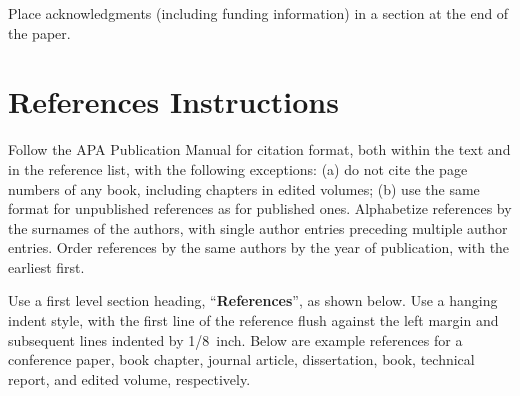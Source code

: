 \documentclass[10pt,letterpaper]{article}
\begin{document}
Place acknowledgments (including funding information) in a section at
the end of the paper.


\section{References Instructions}

Follow the APA Publication Manual for citation format, both within the
text and in the reference list, with the following exceptions: (a) do
not cite the page numbers of any book, including chapters in edited
volumes; (b) use the same format for unpublished references as for
published ones. Alphabetize references by the surnames of the authors,
with single author entries preceding multiple author entries. Order
references by the same authors by the year of publication, with the
earliest first.

Use a first level section heading, ``{\bf References}'', as shown
below. Use a hanging indent style, with the first line of the
reference flush against the left margin and subsequent lines indented
by 1/8~inch. Below are example references for a conference paper, book
chapter, journal article, dissertation, book, technical report, and
edited volume, respectively.

\nocite{ChalnickBillman1988a}
\nocite{Feigenbaum1963a}
\nocite{Hill1983a}
\nocite{OhlssonLangley1985a}
\nocite{Matlock2001}
\nocite{NewellSimon1972a}
\nocite{ShragerLangley1990a}




\setlength{\bibleftmargin}{.125in}
\setlength{\bibindent}{-\bibleftmargin}


\end{document}
